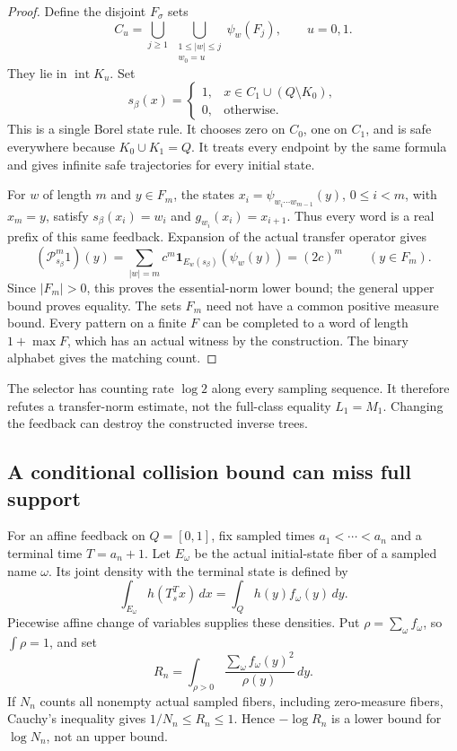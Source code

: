 \documentclass[11pt,reqno]{amsart}
\numberwithin{equation}{section}
\theoremstyle{definition}
\newcommand{\one}{\mathbf 1}
\newcommand{\intr}{\operatorname{int}}
\begin{document}
\begin{proof}
Define the disjoint $F_\sigma$ sets
\[
 C_u=\bigcup_{j\ge1}\ 
      \bigcup_{\substack{1\le|w|\le j\\w_0=u}}\psi_w(F_j),
 \qquad u=0,1.
\]
They lie in $\intr K_u$. Set
\[
 s_\beta(x)=
 \begin{cases}
  1,&x\in C_1\cup(Q\setminus K_0),\\
  0,&\text{otherwise}.
 \end{cases}
\]
This is a single Borel state rule. It chooses zero on $C_0$,
one on $C_1$, and is safe everywhere because $K_0\cup K_1=Q$.
It treats every endpoint by the same formula and gives infinite
safe trajectories for every initial state.

For $w$ of length $m$ and $y\in F_m$, the states
$x_i=\psi_{w_i\cdots w_{m-1}}(y)$, $0\le i<m$, with $x_m=y$,
satisfy $s_\beta(x_i)=w_i$ and $g_{w_i}(x_i)=x_{i+1}$.
Thus every word is a real prefix of this same feedback.
Expansion of the actual transfer operator gives
\[
 (\mathcal P_{s_\beta}^m1)(y)
 =\sum_{|w|=m}c^m\one_{E_w(s_\beta)}(\psi_w(y))
 =(2c)^m\qquad(y\in F_m).
\]
Since $|F_m|>0$, this proves the essential-norm lower bound;
the general upper bound proves equality. The sets $F_m$ need
not have a common positive measure bound.
Every pattern on a finite $F$ can be completed to a word of
length $1+\max F$, which has an actual witness by the
construction. The binary alphabet gives the matching count.
\end{proof}

The selector has counting rate $\log2$ along every sampling
sequence. It therefore refutes a transfer-norm estimate, not
the full-class equality $L_1=M_1$. Changing the feedback can
destroy the constructed inverse trees.

\subsection{A conditional collision bound can miss full support}

For an affine feedback on $Q=[0,1]$, fix sampled times
$a_1<\cdots<a_n$ and a terminal time $T=a_n+1$.
Let $E_\omega$ be the actual initial-state fiber of a sampled
name $\omega$. Its joint density with the terminal state is
defined by
\[
 \int_{E_\omega}h(T_s^Tx)\,dx
 =\int_Q h(y)f_\omega(y)\,dy.
\]
Piecewise affine change of variables supplies these densities.
Put $\rho=\sum_\omega f_\omega$, so $\int\rho=1$, and set
\[
 R_n=\int_{\rho>0}
       \frac{\sum_\omega f_\omega(y)^2}{\rho(y)}\,dy.
\]
If $N_n$ counts all nonempty actual sampled fibers, including
zero-measure fibers, Cauchy's inequality gives
$1/N_n\le R_n\le1$. Hence $-\log R_n$ is a lower bound for
$\log N_n$, not an upper bound.
\end{document}
